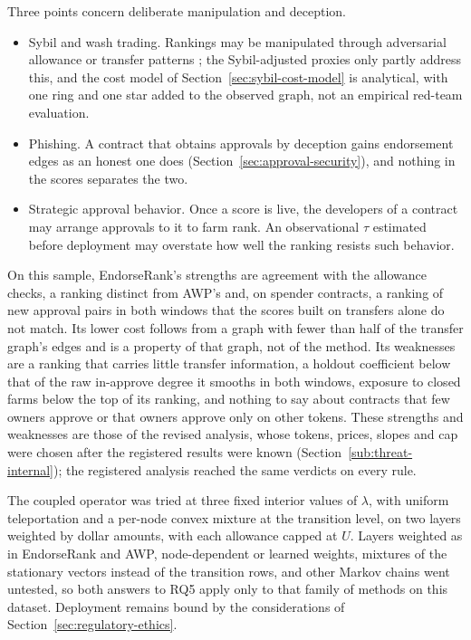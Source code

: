
Three points concern deliberate manipulation and deception.

\begin{itemize}
\item Sybil and wash trading. Rankings may be manipulated through adversarial allowance or transfer patterns \parencite{douceur2002sybil}; the Sybil-adjusted proxies only partly address this, and the cost model of Section~\ref{sec:sybil-cost-model} is analytical, with one ring and one star added to the observed graph, not an empirical red-team evaluation.
\item Phishing. A contract that obtains approvals by deception gains endorsement edges as an honest one does (Section~\ref{sec:approval-security}), and nothing in the scores separates the two.
\item Strategic approval behavior. Once a score is live, the developers of a contract may arrange approvals to it to farm rank. An observational $\tau$ estimated before deployment may overstate how well the ranking resists such behavior.
\end{itemize}


On this sample, EndorseRank's strengths are agreement with the allowance checks, a ranking distinct from AWP's and, on spender contracts, a ranking of new approval pairs in both windows that the scores built on transfers alone do not match. Its lower cost follows from a graph with fewer than half of the transfer graph's edges and is a property of that graph, not of the method. Its weaknesses are a ranking that carries little transfer information, a holdout coefficient below that of the raw in-approve degree it smooths in both windows, exposure to closed farms below the top of its ranking, and nothing to say about contracts that few owners approve or that owners approve only on other tokens. These strengths and weaknesses are those of the revised analysis, whose tokens, prices, slopes and cap were chosen after the registered results were known (Section~\ref{sub:threat-internal}); the registered analysis reached the same verdicts on every rule.

The coupled operator was tried at three fixed interior values of $\lambda$, with uniform teleportation and a per-node convex mixture at the transition level, on two layers weighted by dollar amounts, with each allowance capped at $U$. Layers weighted as in EndorseRank and AWP, node-dependent or learned weights, mixtures of the stationary vectors instead of the transition rows, and other Markov chains went untested, so both answers to RQ5 apply only to that family of methods on this dataset. Deployment remains bound by the considerations of Section~\ref{sec:regulatory-ethics}.

